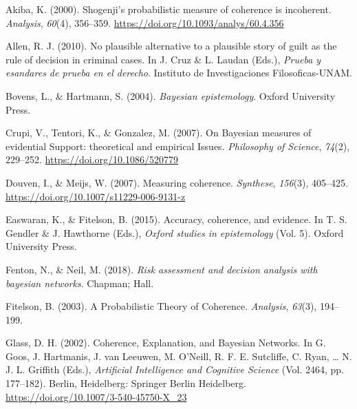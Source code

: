 \documentclass[
  10pt,
]{scrartcl}
\newlength{\cslhangindent}
\newlength{\cslentryspacingunit} %
\newenvironment{CSLReferences}[2] %
 {%
  \setlength{\parindent}{0pt}
  \ifodd #1
  \let\oldpar\par
  \def\par{\hangindent=\cslhangindent\oldpar}
  \fi
  \setlength{\parskip}{#2\cslentryspacingunit}
 }%
 {}
\begin{document}
\hypertarget{refs}{}
\begin{CSLReferences}{1}{0}
\leavevmode{}%
Akiba, K. (2000). Shogenji's probabilistic measure of coherence is incoherent. \emph{Analysis}, \emph{60}(4), 356--359. \url{https://doi.org/10.1093/analys/60.4.356}

\leavevmode{}%
Allen, R. J. (2010). No plausible alternative to a plausible story of guilt as the rule of decision in criminal cases. In J. Cruz \& L. Laudan (Eds.), \emph{Prueba y esandares de prueba en el derecho}. Instituto de Investigaciones Filosoficas-UNAM.

\leavevmode{}%
Bovens, L., \& Hartmann, S. (2004). \emph{Bayesian epistemology}. Oxford University Press.

\leavevmode{}%
Crupi, V., Tentori, K., \& Gonzalez, M. (2007). On {Bayesian measures} of {evidential Support}: {theoretical} and {empirical Issues}. \emph{Philosophy of Science}, \emph{74}(2), 229--252. \url{https://doi.org/10.1086/520779}

\leavevmode{}%
Douven, I., \& Meijs, W. (2007). Measuring coherence. \emph{Synthese}, \emph{156}(3), 405--425. \url{https://doi.org/10.1007/s11229-006-9131-z}

\leavevmode{}%
Easwaran, K., \& Fitelson, B. (2015). Accuracy, coherence, and evidence. In T. S. Gendler \& J. Hawthorne (Eds.), \emph{Oxford studies in epistemology} (Vol. 5). Oxford University Press.

\leavevmode{}%
Fenton, N., \& Neil, M. (2018). \emph{Risk assessment and decision analysis with bayesian networks}. Chapman; Hall.

\leavevmode{}%
Fitelson, B. (2003). A {Probabilistic Theory} of {Coherence}. \emph{Analysis}, \emph{63}(3), 194--199.

\leavevmode{}%
Glass, D. H. (2002). Coherence, {Explanation}, and {Bayesian Networks}. In G. Goos, J. Hartmanis, J. van Leeuwen, M. O'Neill, R. F. E. Sutcliffe, C. Ryan, \ldots{} N. J. L. Griffith (Eds.), \emph{Artificial {Intelligence} and {Cognitive Science}} (Vol. 2464, pp. 177--182). {Berlin, Heidelberg}: {Springer Berlin Heidelberg}. \url{https://doi.org/10.1007/3-540-45750-X_23}


\end{CSLReferences}
\end{document}
